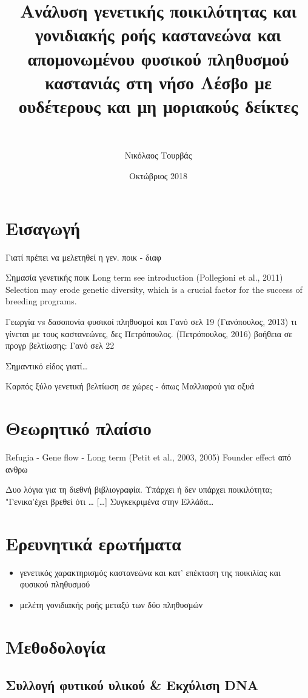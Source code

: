 \documentclass[12pt,a4paper,]{report}
\title{Ανάλυση γενετικής ποικιλότητας και γονιδιακής ροής καστανεώνα και
απομονωμένου φυσικού πληθυσμού καστανιάς στη νήσο Λέσβο με ουδέτερους
και μη μοριακούς δείκτες}
\subtitle{~}
\author{Νικόλαος Τουρβάς}
\date{Οκτώβριος 2018}
\providecommand{\tightlist}{%
  \setlength{\itemsep}{0pt}\setlength{\parskip}{0pt}}
\begin{document}
\maketitle

\section{Εισαγωγή}

Γιατί πρέπει να μελετηθεί η γεν. ποικ - διαφ

Σημασία γενετικής ποικ Long term see introduction (Pollegioni et al.,
2011) Selection may erode genetic diversity, which is a crucial factor
for the success of breeding programs.

Γεωργία vs δασοπονία φυσικοί πληθυσμοί και Γανό σελ 19 (Γανόπουλος,
2013) τι γίνεται με τους καστανεώνες, δες Πετρόπουλος. (Πετρόπουλος,
2016) βοήθεια σε προγρ βελτίωσης: Γανό σελ 22

Σημαντικό είδος γιατί\ldots{}

Καρπός ξύλο γενετική βελτίωση σε χώρες - όπως Μαλλιαρού για οξυά

\hypertarget{-}{%
\section{Θεωρητικό πλαίσιο}\label{-}}

Refugia - Gene flow - Long term (Petit et al., 2003, 2005) Founder
effect από ανθρω

Δυο λόγια για τη διεθνή βιβλιογραφία. Υπάρχει ή δεν υπάρχει ποικιλότητα;
"Γενικα'έχει βρεθεί ότι \ldots{} {[}\ldots{}{]} Συγκεκριμένα στην
Ελλάδα\ldots{}

\hypertarget{-}{%
\section{Ερευνητικά ερωτήματα}\label{-}}

\begin{itemize}
\tightlist
\item
  γενετικός χαρακτηρισμός καστανεώνα και κατ' επέκταση της ποικιλίας και
  φυσικού πληθυσμού
\item
  μελέτη γονιδιακής ροής μεταξύ των δύο πληθυσμών
\end{itemize}

\section{Μεθοδολογία}

\hypertarget{----dna}{%
\subsection{Συλλογή φυτικού υλικού \& Εκχύλιση DNA}\label{----dna}}
\end{document}
